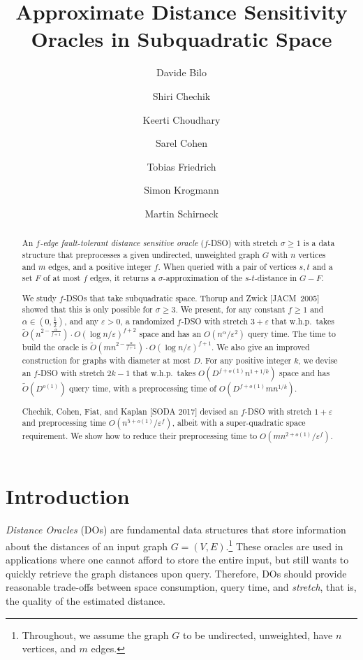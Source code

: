 \documentclass{article}\usepackage[a4paper,margin=20mm]{geometry}
\title{Approximate Distance Sensitivity Oracles in Subquadratic Space}
\author{Davide Bilo \and Shiri Chechik \and Keerti Choudhary \and Sarel Cohen \and Tobias Friedrich \and Simon Krogmann \and Martin Schirneck}\date{}
\renewcommand{\ge}{\geqslant}
\begin{document}
\maketitle

\begin{abstract}
	An \emph{\(f\)-edge fault-tolerant distance sensitive oracle} (\(f\)-DSO) with stretch \(\sigma \ge 1\)
	is a data structure that preprocesses a given undirected, unweighted graph \(G\) with \(n\) vertices and \(m\) edges, 
	and a positive integer \(f\).
	When queried with a pair of vertices \(s, t\) and a set \(F\) of at most \(f\) edges,
	it returns a \(\sigma\)-approximation of the \(s\)-\(t\)-distance in \(G-F\).

	We study \(f\)-DSOs that take subquadratic space.
	Thorup and Zwick [JACM~2005] showed that this is only possible for \(\sigma \ge 3\).
	We present, for any constant \(f \ge 1\) and \(\alpha \in (0, \frac{1}{2})\), 
	and any \(\varepsilon  > 0\), 
	a randomized \mbox{\(f\)-DSO} with stretch \( 3 + \varepsilon\)
	that w.h.p.\ takes 
	\(\widetilde{O}(n^{2-\frac{\alpha}{f+1}}) \cdot O(\log n/\varepsilon)^{f+2}\)
	space and has an \(O(n^\alpha/\varepsilon^2)\) query time.
	The time to build the oracle is \(\widetilde{O}(mn^{2-\frac{\alpha}{f+1}}) \cdot O(\log n/\varepsilon)^{f+1}\).
	We also give an improved construction for graphs with diameter at most \(D\).
	For any positive integer \(k\), we devise an \(f\)-DSO with stretch \(2k-1\) that w.h.p.\ takes
	\(O(D^{f+o(1)} n^{1+1/k})\) space and has \(\widetilde{O}(D^{o(1)})\) query time,
	with a preprocessing time of \(O(D^{f+o(1)} mn^{1/k})\).
  
	Chechik, Cohen, Fiat, and Kaplan [SODA 2017] devised an \(f\)-DSO with stretch \(1{+}\varepsilon\) 
	and preprocessing time $O(n^{5+o(1)}/\varepsilon^f)$, 
	albeit with a super-quadratic space requirement.
	We show how to reduce their preprocessing time to $O(mn^{2+o(1)}/\varepsilon^f)$.
\end{abstract}


\section{Introduction}
\label{sec:intro}

\emph{Distance Oracles} (DOs) are fundamental data structures 
that store information about the distances of an input graph $G=(V,E)$.\footnote{%
	Throughout, we assume the graph $G$ to be undirected, unweighted, have $n$ vertices,
	and $m$ edges.
}
These oracles are used in applications where one cannot afford to store the entire input,
but still wants to quickly retrieve the graph distances upon query.
Therefore, DOs should provide reasonable  trade-offs between space consumption, query time,
and \emph{stretch}, that is, the quality of the estimated distance. 
\end{document}
